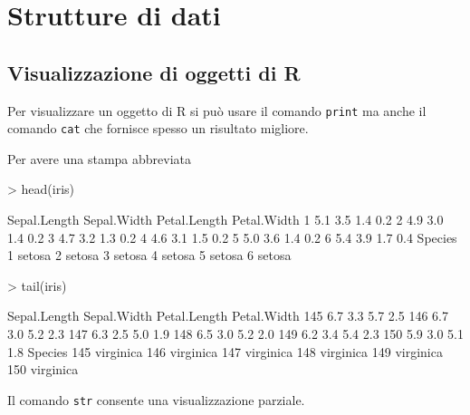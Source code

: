 \documentclass[onecolumn,11pt]{book}
\begin{document}
\chapter{Strutture di dati}
\section{Visualizzazione di oggetti di \textsf{R}}
Per visualizzare un oggetto di \textsf{R} si pu\`o usare il comando \texttt{print} ma anche il comando \texttt{cat} che fornisce spesso un risultato migliore. 

Per avere una stampa abbreviata
\begin{Schunk}
\begin{Sinput}
> head(iris)
\end{Sinput}
\begin{Soutput}
  Sepal.Length Sepal.Width Petal.Length Petal.Width
1          5.1         3.5          1.4         0.2
2          4.9         3.0          1.4         0.2
3          4.7         3.2          1.3         0.2
4          4.6         3.1          1.5         0.2
5          5.0         3.6          1.4         0.2
6          5.4         3.9          1.7         0.4
  Species
1  setosa
2  setosa
3  setosa
4  setosa
5  setosa
6  setosa
\end{Soutput}
\begin{Sinput}
> tail(iris)
\end{Sinput}
\begin{Soutput}
    Sepal.Length Sepal.Width Petal.Length Petal.Width
145          6.7         3.3          5.7         2.5
146          6.7         3.0          5.2         2.3
147          6.3         2.5          5.0         1.9
148          6.5         3.0          5.2         2.0
149          6.2         3.4          5.4         2.3
150          5.9         3.0          5.1         1.8
      Species
145 virginica
146 virginica
147 virginica
148 virginica
149 virginica
150 virginica
\end{Soutput}
\end{Schunk}
Il comando \texttt{str} consente una visualizzazione parziale.
\scriptsize
\begin{Schunk}
\end{Schunk}
\normalsize
\end{document}
